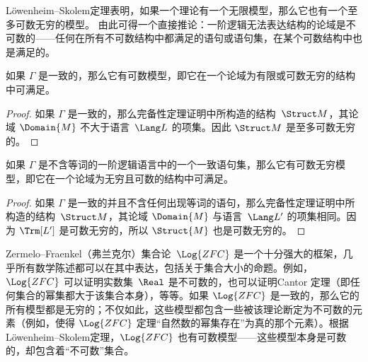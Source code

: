 \documentclass[../../../include/open-logic-section]{subfiles}
\begin{document}

Löwenheim--Skolem定理表明，如果一个理论有一个无限模型，那么它也有一个至多可数无穷的模型。
由此可得一个直接推论：一阶逻辑无法表达结构的论域是不可数的——任何在所有不可数结构中都满足的语句或语句集，在某个可数结构中也是满足的。

\begin{thm}
 如果 $\Gamma$ 是一致的，那么它有可数模型，即它在一个论域为有限或可数无穷的结构中可满足。
\end{thm}

\begin{proof}
如果 $\Gamma$ 是一致的，那么完备性定理证明中所构造的结构~$\Struct M$，其论域 $\Domain{M}$ 不大于语言~$\Lang L$ 的项集。因此 $\Struct M$ 是至多可数无穷的。
\end{proof}

\begin{thm}
 如果 $\Gamma$ 是不含等词的一阶逻辑语言中的一个一致语句集，那么它有可数无穷模型，即它在一个论域为无穷且可数的结构中可满足。
\end{thm}

\begin{proof}
如果 $\Gamma$ 是一致的并且不含任何出现等词的语句，那么完备性定理证明中所构造的结构~$\Struct M$，其论域 $\Domain{M}$ 与语言~$\Lang L'$ 的项集相同。因为 $\Trm[L']$ 是可数无穷的，所以 $\Struct{M}$ 也是可数无穷的。
\end{proof}

\begin{ex}[Skolem悖论]
Zermelo--Fraenkel（弗兰克尔）集合论~$\Log{ZFC}$ 是一个十分强大的框架，几乎所有数学陈述都可以在其中表达，包括关于集合大小的命题。例如，$\Log{ZFC}$ 可以证明实数集~$\Real$ 是不可数的，也可以证明Cantor 定理（即任何集合的幂集都大于该集合本身），等等。如果 $\Log{ZFC}$ 是一致的，那么它的所有模型都是无穷的；不仅如此，这些模型都包含一些被该理论断定为不可数的元素（例如，使得 $\Log{ZFC}$ 定理“自然数的幂集存在”为真的那个元素）。根据Löwenheim--Skolem定理，$\Log{ZFC}$ 也有可数模型——这些模型本身是可数的，却包含着“不可数”集合。
\end{ex}
\end{document}
